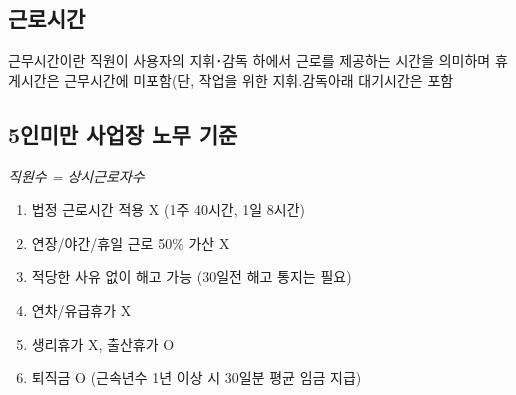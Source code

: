 \subsection{근로시간}
\begin{mdframed}[linecolor=blue,middlelinewidth=2]
근무시간이란 직원이 사용자의 지휘･감독 하에서 근로를 제공하는 시간을 의미하며 휴게시간은 근무시간에 미포함(단, 작업을 위한 지휘.감독아래 대기시간은 포함
\end{mdframed}

\subsection{5인미만 사업장 노무 기준}
\emph{직원수 = 상시근로자수}\par
{}
\par
\medskip

\begin{enumerate}[1)]\tightlist
\item 법정 근로시간 적용 X (1주 40시간, 1일 8시간)
\item 연장/야간/휴일 근로 50\% 가산 X
\item 적당한 사유 없이 해고 가능 (30일전 해고 통지는 필요)
\item 연차/유급휴가 X
\item 생리휴가 X, 출산휴가 O
\item 퇴직금 O (근속년수 1년 이상 시 30일분 평균 임금 지급)
\end{enumerate}
